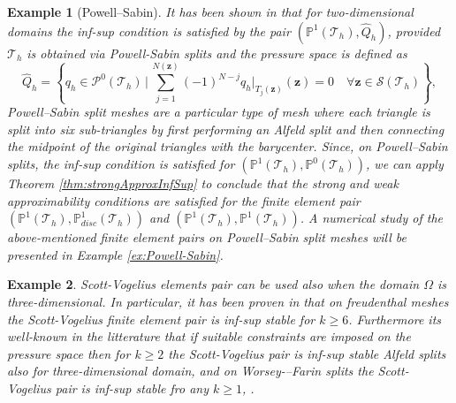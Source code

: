 \documentclass[USenglish]{article}
\theoremstyle{dgthm}
\theoremstyle{dgdef}
\newtheorem{example}{Example}
\let\vec\bm
\begin{document}
\begin{example}[Powell--Sabin]
  It has been shown in \cite{GuzmanLischkeNeilan, FabienGuzmanNeilanZytoon} that for two-dimensional domains the inf-sup condition is satisfied by the pair $\left(\mathbb{P}^1(\mathcal{T}_h),\hat{Q}_h\right)$, provided $\mathcal{T}_h$ is obtained via Powell-Sabin splits and the pressure space is defined as
  \begin{equation}
    \hat{Q}_h = \left\{q_h\in \mathcal{P}^{0}(\mathcal{T}_h)\,|\, \sum_{j=1}^{N(\vec{z})} (-1)^{N-j} q_h\big|_{T_j(\vec{z})}(\vec{z}) = 0 \quad \forall \vec{z}\in \mathcal{S}(\mathcal{T}_h)\right\},
  \end{equation}
  Powell--Sabin split meshes are a particular type of mesh where each triangle is split into six sub-triangles by first performing an Alfeld split and then connecting the midpoint of the original triangles with the barycenter.
  Since, on Powell--Sabin splits, the inf-sup condition is satisfied for $\left(\mathbb{P}^1(\mathcal{T}_h),\mathbb{P}^0(\mathcal{T}_h)\right)$, we can apply Theorem \ref{thm:strongApproxInfSup} to conclude that the strong and weak approximability conditions are satisfied for the finite element pair $\left(\mathbb{P}^1(\mathcal{T}_h),\mathbb{P}^1_{disc}(\mathcal{T}_h)\right)$ and $\left(\mathbb{P}^1(\mathcal{T}_h),\mathbb{P}^1(\mathcal{T}_h)\right)$.
  A numerical study of the above-mentioned finite element pairs on Powell--Sabin split meshes will be presented in Example \ref{ex:Powell-Sabin}.
\end{example}
\begin{example}
  Scott-Vogelius elements pair can be used also when the domain $\Omega$ is three-dimensional. In  particular, it has been proven in \cite{Zhang} that on freudenthal meshes the Scott-Vogelius finite element pair is inf-sup stable for $k\geq 6$.
  Furthermore its well-known in the litterature that if suitable constraints are imposed on the pressure space then for $k\geq 2$ the Scott-Vogelius pair is inf-sup stable Alfeld splits also for three-dimensional domain, and on Worsey-–Farin splits the Scott-Vogelius pair is inf-sup stable fro any $k\geq 1$, \cite{FuGuzmanNeilan, FabienGuzmanNeilanZytoon}.
\end{example}

\end{document}
